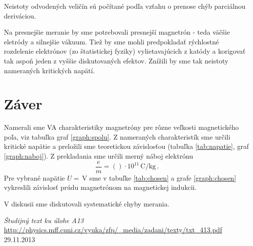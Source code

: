 \documentclass[a4paper, 10pt]{article}
\newcommand{\unit}[1]{\ensuremath{\, \mathrm{#1}}}
\begin{document}
Neistoty odvodených veličín sú počítané podľa vzťahu o prenose chýb parciálnou deriváciou.

Na presnejšie meranie by sme potrebovali presnejší magnetrón - teda väčšie eletródy a silnejšie vákuum. Tiež by sme mohli predpokladať rýchlostné rozdelenie elektrónov (zo štatistickej fyziky) vylietavajúcich z katódy a korigovať tak aspoň jeden z vyššie diskutovaných efektov. Znížili by sme tak neistoty nameraných kritických napätí.
\section*{Záver}
Namerali sme VA charakteristiky magnetróny pre rôzne veľkosti magnetického poľa, viz tabuľka graf \ref{graph:spolu}. Z nameraných charakteristík sme určili kritické napätie a preložili sme teoretickou závislosťou (tabuľka \ref{tab:napatie}, graf \ref{graph:naboj}). Z prekladania sme určili merný náboj elektrónu 
$$
\frac{e}{m} = ( )\cdot 10^{11} \unit{C/kg}\,.
$$
Pre vybrané napätie $U=  \unit V$ sme v tabuľke \ref{tab:chosen} a grafe \ref{graph:chosen} vykreslili závislosť prúdu magnetrónom na magnetickej indukcii.

V diskusii sme diskutovali systematické chyby merania.
\begin{thebibliography}{9}

    \emph{Študijný text ku úlohe A13} \\
    \url{http://physics.mff.cuni.cz/vyuka/zfp/_media/zadani/texty/txt_413.pdf} 29.11.2013

\end{thebibliography}
\end{document}
